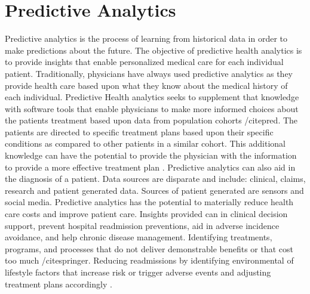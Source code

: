 \documentclass[sigconf]{acmart}
\begin{document}
\section{Predictive Analytics}

Predictive analytics is the process of learning from historical data in order to make predictions about the future. The objective of predictive health analytics is to provide insights that enable personalized medical care for each individual patient. Traditionally, physicians have always used predictive analytics as they provide health care based upon what they know about the medical history of each individual. Predictive Health analytics seeks to supplement that knowledge with software tools that enable physicians to make more informed choices about the patients treatment based upon data from population cohorts /cite{pred}.  The patients are directed to specific treatment plans based upon their specific conditions as compared to other patients in a similar cohort.  This additional knowledge can have the potential to provide the physician with the information to provide a more effective treatment plan \cite{www-google-pred}. Predictive analytics can also aid in the diagnosis of a patient. Data sources are disparate and include: clinical, claims, research and patient generated data. Sources of patient generated are sensors and social media.  
Predictive analytics has the potential to materially reduce health care costs and improve patient care.   Insights provided can in clinical decision support, prevent hospital readmission preventions, aid in adverse incidence avoidance, and help chronic disease management. 
Identifying treatments, programs, and processes that do not deliver demonstrable benefits or that cost too much /cite{springer}. Reducing readmissions by identifying environmental of lifestyle factors that increase risk or trigger adverse events and adjusting treatment plans accordingly \cite{springer}.  
  
\end{document}

